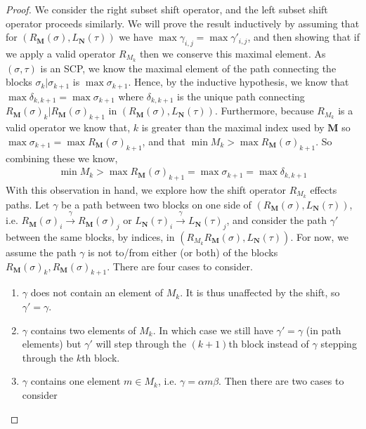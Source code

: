 \begin{proof}
We consider the right subset shift operator, and the left subset shift operator proceeds similarly.
We will prove the result inductively by assuming that for $(R_{\mathbf{M}}(\sigma),L_{\mathbf{N}}(\tau))$ we have $\max \gamma_{i,j} = \max \gamma'_{i,j}$, and then showing that if we apply a valid operator $R_{M_k}$ then we conserve this maximal element. 
As $(\sigma,\tau)$ is an SCP, we know the maximal element of the path connecting the blocks $\sigma_k|\sigma_{k+1}$ is $\max \sigma_{k+1}$. 
Hence, by the inductive hypothesis, we know that $\max \delta_{k,k+1} = \max \sigma_{k+1}$ where $\delta_{k,k+1} $ is the unique path connecting $R_{\mathbf{M}}(\sigma)_k|R_{\mathbf{M}}(\sigma)_{k+1}$ in $(R_{\mathbf{M}}(\sigma),L_{\mathbf{N}}(\tau))$.
Furthermore, because $R_{M_k}$ is a valid operator we know that, $k$ is greater than the maximal index used by $\mathbf{M}$ so $\max \sigma_{k+1} = \max R_{\mathbf{M}}(\sigma)_{k+1}$, and that $\min M_k > \max R_{\mathbf{M}}(\sigma)_{k+1}$.
So combining these we know, 
\begin{align}\label{eq:shift subset dominates adj path}
    \min M_k > \max R_{\mathbf{M}}(\sigma)_{k+1} = \max \sigma_{k+1} = \max \delta_{k,k+1}
\end{align}
With this observation in hand, we explore how the shift operator $R_{M_k}$ effects paths. 
Let $\gamma$ be a path between two blocks on one side of $(R_{\mathbf{M}}(\sigma),L_{\mathbf{N}}(\tau))$, i.e. $R_{\mathbf{M}}(\sigma)_i \xrightarrow{\gamma} R_{\mathbf{M}}(\sigma)_j$ or $L_{\mathbf{N}}(\tau)_i \xrightarrow{\gamma} L_{\mathbf{N}}(\tau)_j$, and consider the path $\gamma'$ between the same blocks, by indices, in $(R_{M_k}R_{\mathbf{M}}(\sigma),L_{\mathbf{N}}(\tau))$. For now, we assume the path $\gamma$ is not to/from either (or both) of the blocks $R_{\mathbf{M}}(\sigma)_k, R_{\mathbf{M}}(\sigma)_{k+1}$. There are four cases to consider. 
\begin{enumerate}
    \item $\gamma$ does not contain an element of $M_k$. It is thus unaffected by the shift, so $\gamma' = \gamma$.
    \item $\gamma$ contains two elements of $M_k$. In which case we still have $\gamma'=\gamma$ (in path elements) but $\gamma'$ will step through the $(k+1)$th block instead of $\gamma$ stepping through the $k$th block.
    \item $\gamma$ contains one element $m\in M_k$, i.e. $\gamma = \alpha m \beta$. Then there are two cases to consider

\end{enumerate}
\end{proof}
